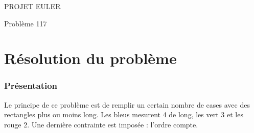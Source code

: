 \documentclass{article}
\begin{document}
\hfill
\hfill
\hfill
\begin{center}
  \large{PROJET EULER}

  Problème 117
\end{center}
\tableofcontents
\newpage
\part {Résolution du problème}
\section {Présentation}

Le principe de ce problème est de remplir un certain nombre de cases avec des rectangles plus ou moins long. Les bleus mesurent 4 de long, les vert 3 et les rouge 2. Une dernière contrainte est imposée : l'ordre compte.
\end{document}
